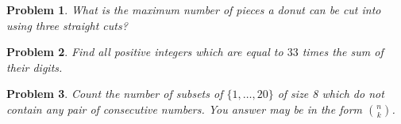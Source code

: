 \documentclass[a4paper,12pt]{article}
\theoremstyle{perfect}
\newtheorem{prb}{Problem}
\begin{document}
\begin{prb}
What is the maximum number of pieces a donut can be cut into using three straight cuts?
\end{prb}

\begin{prb}
Find all positive integers which are equal to $33$ times the sum of their digits.
\end{prb}


\begin{prb}
Count the number of subsets of $\{1,\ldots, 20\}$ of size 8 which do not contain any pair of consecutive numbers. You answer may be in the form $n \choose k$.
\end{prb}
\end{document}
